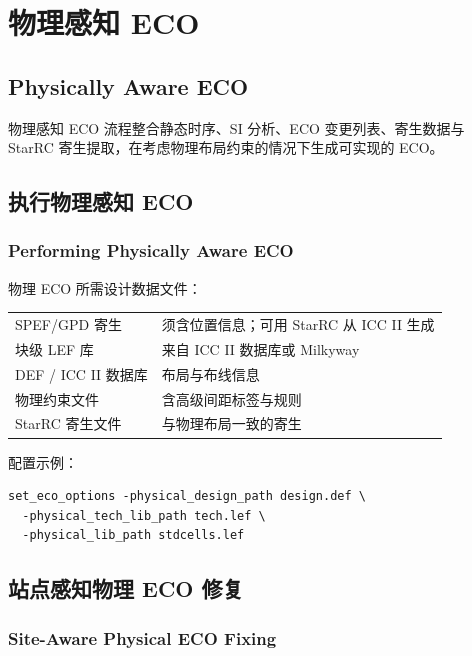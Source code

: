 \section{物理感知 ECO}
\subsection*{Physically Aware ECO}

物理感知 ECO 流程整合静态时序、SI 分析、ECO 变更列表、寄生数据与 StarRC 寄生提取，在考虑物理布局约束的情况下生成可实现的 ECO。


\subsection{执行物理感知 ECO}
\subsubsection*{Performing Physically Aware ECO}

物理 ECO 所需设计数据文件：
\begin{longtable}{|L{0.28\textwidth}|L{0.65\textwidth}|}
\hline
{} &  \\
\hline
SPEF/GPD 寄生 & 须含位置信息；可用 StarRC 从 ICC II 生成 \\
块级 LEF 库 & 来自 ICC II 数据库或 Milkyway \\
DEF / ICC II 数据库 & 布局与布线信息 \\
物理约束文件 & 含高级间距标签与规则 \\
StarRC 寄生文件 & 与物理布局一致的寄生 \\
\hline
\end{longtable}

配置示例：
\begin{lstlisting}
set_eco_options -physical_design_path design.def \
  -physical_tech_lib_path tech.lef \
  -physical_lib_path stdcells.lef
\end{lstlisting}

\subsection{站点感知物理 ECO 修复}
\subsubsection*{Site-Aware Physical ECO Fixing}

